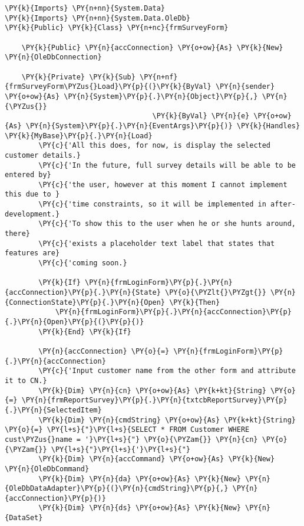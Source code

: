 \begin{Verbatim}[commandchars=\\\{\}]
\PY{k}{Imports} \PY{n+nn}{System.Data}
\PY{k}{Imports} \PY{n+nn}{System.Data.OleDb}
\PY{k}{Public} \PY{k}{Class} \PY{n+nc}{frmSurveyForm}

    \PY{k}{Public} \PY{n}{accConnection} \PY{o+ow}{As} \PY{k}{New} \PY{n}{OleDbConnection}

    \PY{k}{Private} \PY{k}{Sub} \PY{n+nf}{frmSurveyForm\PYZus{}Load}\PY{p}{(}\PY{k}{ByVal} \PY{n}{sender} \PY{o+ow}{As} \PY{n}{System}\PY{p}{.}\PY{n}{Object}\PY{p}{,} \PY{n}{\PYZus{}}
                                   \PY{k}{ByVal} \PY{n}{e} \PY{o+ow}{As} \PY{n}{System}\PY{p}{.}\PY{n}{EventArgs}\PY{p}{)} \PY{k}{Handles} \PY{k}{MyBase}\PY{p}{.}\PY{n}{Load}
        \PY{c}{'All this does, for now, is display the selected customer details.}
        \PY{c}{'In the future, full survey details will be able to be entered by}
        \PY{c}{'the user, however at this moment I cannot implement this due to }
        \PY{c}{'time constraints, so it will be implemented in after-development.}
        \PY{c}{'To show this to the user when he or she hunts around, there}
        \PY{c}{'exists a placeholder text label that states that features are}
        \PY{c}{'coming soon.}

        \PY{k}{If} \PY{n}{frmLoginForm}\PY{p}{.}\PY{n}{accConnection}\PY{p}{.}\PY{n}{State} \PY{o}{\PYZlt{}\PYZgt{}} \PY{n}{ConnectionState}\PY{p}{.}\PY{n}{Open} \PY{k}{Then}
            \PY{n}{frmLoginForm}\PY{p}{.}\PY{n}{accConnection}\PY{p}{.}\PY{n}{Open}\PY{p}{(}\PY{p}{)}
        \PY{k}{End} \PY{k}{If}

        \PY{n}{accConnection} \PY{o}{=} \PY{n}{frmLoginForm}\PY{p}{.}\PY{n}{accConnection}
        \PY{c}{'Input customer name from the other form and attribute it to CN.}
        \PY{k}{Dim} \PY{n}{cn} \PY{o+ow}{As} \PY{k+kt}{String} \PY{o}{=} \PY{n}{frmReportSurvey}\PY{p}{.}\PY{n}{txtcbReportSurvey}\PY{p}{.}\PY{n}{SelectedItem}
        \PY{k}{Dim} \PY{n}{cmdString} \PY{o+ow}{As} \PY{k+kt}{String} \PY{o}{=} \PY{l+s}{"}\PY{l+s}{SELECT * FROM Customer WHERE cust\PYZus{}name = '}\PY{l+s}{"} \PY{o}{\PYZam{}} \PY{n}{cn} \PY{o}{\PYZam{}} \PY{l+s}{"}\PY{l+s}{'}\PY{l+s}{"}
        \PY{k}{Dim} \PY{n}{accCommand} \PY{o+ow}{As} \PY{k}{New} \PY{n}{OleDbCommand}
        \PY{k}{Dim} \PY{n}{da} \PY{o+ow}{As} \PY{k}{New} \PY{n}{OleDbDataAdapter}\PY{p}{(}\PY{n}{cmdString}\PY{p}{,} \PY{n}{accConnection}\PY{p}{)}
        \PY{k}{Dim} \PY{n}{ds} \PY{o+ow}{As} \PY{k}{New} \PY{n}{DataSet}


\end{Verbatim}
